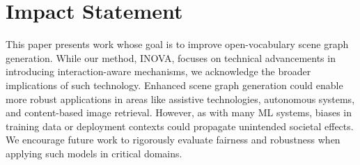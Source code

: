 \section*{Impact Statement}
This paper presents work whose goal is to improve open-vocabulary scene graph generation. While our method, INOVA, focuses on technical advancements in introducing interaction-aware mechanisms, we acknowledge the broader implications of such technology. Enhanced scene graph generation could enable more robust applications in areas like assistive technologies, autonomous systems, and content-based image retrieval. However, as with many ML systems, biases in training data or deployment contexts could propagate unintended societal effects. We encourage future work to rigorously evaluate fairness and robustness when applying such models in critical domains. 
